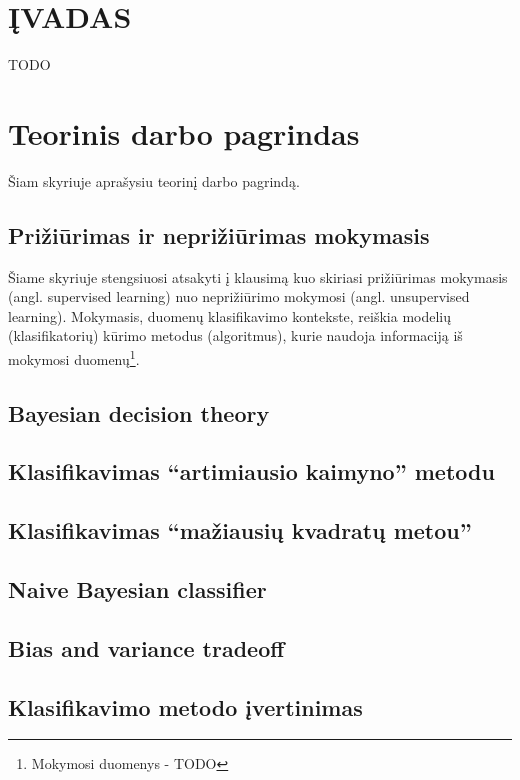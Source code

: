 \documentclass{article}
\begin{document}
\let \savenumberline \numberline
\def \numberline#1{\savenumberline{#1.}}
\tableofcontents
\newpage

\section*{ĮVADAS}
TODO
%

\section{Teorinis darbo pagrindas}
Šiam skyriuje aprašysiu teorinį darbo pagrindą. \cite{greenwade93}
\subsection{Prižiūrimas ir neprižiūrimas mokymasis}
Šiame skyriuje stengsiuosi atsakyti į klausimą kuo skiriasi prižiūrimas mokymasis
(angl. supervised learning) nuo neprižiūrimo mokymosi (angl. unsupervised
learning). Mokymasis, duomenų klasifikavimo kontekste, reiškia modelių
(klasifikatorių) kūrimo metodus (algoritmus), kurie naudoja informaciją iš
mokymosi duomenų\footnote{Mokymosi duomenys - TODO}.


\subsection{Bayesian decision theory}
\subsection{Klasifikavimas ``artimiausio kaimyno'' metodu}
\subsection{Klasifikavimas ``mažiausių kvadratų metou''}
\subsection{Naive Bayesian classifier}
\subsection{Bias and variance tradeoff}
\subsection{Klasifikavimo metodo įvertinimas}
\end{document}
